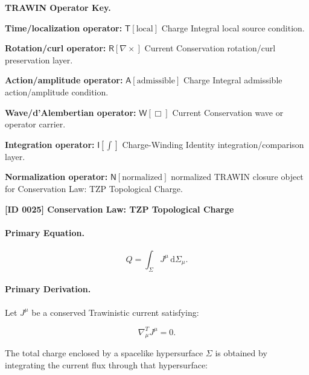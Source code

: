 \par\vspace{0.45\baselineskip}
\noindent\begin{minipage}[t]{\linewidth}
\begingroup
\small
\raggedright
\textbf{TRAWIN Operator Key.}\par
\noindent\textbf{Time/localization operator:} $\mathsf{T}\!\left[\mathrm{local}\right]$ Charge Integral local source condition.\par
\noindent\textbf{Rotation/curl operator:} $\mathsf{R}\!\left[\nabla\times\right]$ Current Conservation rotation/curl preservation layer.\par
\noindent\textbf{Action/amplitude operator:} $\mathsf{A}\!\left[\mathrm{admissible}\right]$ Charge Integral admissible action/amplitude condition.\par
\noindent\textbf{Wave/d'Alembertian operator:} $\mathsf{W}\!\left[\Box\right]$ Current Conservation wave or operator carrier.\par
\noindent\textbf{Integration operator:} $\mathsf{I}\!\left[\int\right]$ Charge-Winding Identity integration/comparison layer.\par
\noindent\textbf{Normalization operator:} $\mathsf{N}\!\left[\mathrm{normalized}\right]$ normalized TRAWIN closure object for Conservation Law: TZP Topological Charge.\par
\endgroup
\end{minipage}

\clearpage
\noindent\textbf{[ID 0025] Conservation Law: TZP Topological Charge}\par
\vspace{0.35em}
\paragraph{Primary Equation.}
\begin{equation}
Q
=
\int_{\Sigma}
J^\mu
\,\mathrm{d}\Sigma_\mu .
\end{equation}

\paragraph{Primary Derivation.}
Let $J^\mu$ be a conserved Trawinistic current satisfying:

\begin{equation}
\nabla^T_\mu J^\mu = 0 .
\end{equation}

The total charge enclosed by a spacelike hypersurface $\Sigma$ is obtained by integrating the current flux through that hypersurface:

